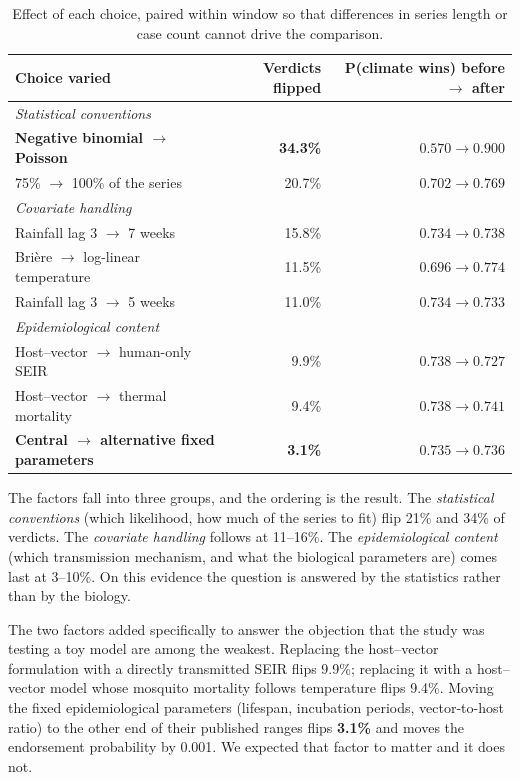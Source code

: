 \documentclass[11pt,a4paper]{article}
\begin{document}
\begin{table}[htbp]
\centering
\caption{Effect of each choice, paired within window so that differences in
series length or case count cannot drive the comparison.}
\begin{tabular}{lrr}
\toprule
Choice varied & Verdicts flipped & P(climate wins) before $\to$ after \\
\midrule
\multicolumn{3}{l}{\emph{Statistical conventions}} \\
\textbf{Negative binomial $\to$ Poisson} & \textbf{34.3\%} & $0.570 \to 0.900$ \\
75\% $\to$ 100\% of the series & 20.7\% & $0.702 \to 0.769$ \\
\midrule
\multicolumn{3}{l}{\emph{Covariate handling}} \\
Rainfall lag 3 $\to$ 7 weeks & 15.8\% & $0.734 \to 0.738$ \\
Brière $\to$ log-linear temperature & 11.5\% & $0.696 \to 0.774$ \\
Rainfall lag 3 $\to$ 5 weeks & 11.0\% & $0.734 \to 0.733$ \\
\midrule
\multicolumn{3}{l}{\emph{Epidemiological content}} \\
Host--vector $\to$ human-only SEIR & 9.9\% & $0.738 \to 0.727$ \\
Host--vector $\to$ thermal mortality & 9.4\% & $0.738 \to 0.741$ \\
\textbf{Central $\to$ alternative fixed parameters} & \textbf{3.1\%} & $0.735 \to 0.736$ \\
\bottomrule
\end{tabular}
\end{table}

The factors fall into three groups, and the ordering is the result. The
\emph{statistical conventions} (which likelihood, how much of the series to
fit) flip 21\% and 34\% of verdicts. The \emph{covariate handling} follows at
11--16\%. The \emph{epidemiological content} (which transmission mechanism, and
what the biological parameters are) comes last at 3--10\%. On this evidence the
question is answered by the statistics rather than by the biology.

The two factors added specifically to answer the objection that the study was
testing a toy model are among the weakest. Replacing the host--vector formulation
with a directly transmitted SEIR flips 9.9\%; replacing it with a host--vector
model whose mosquito mortality follows temperature flips 9.4\%. Moving the fixed
epidemiological parameters (lifespan, incubation periods, vector-to-host ratio) to the other end of their published ranges flips \textbf{3.1\%} and moves the
endorsement probability by 0.001. We expected that factor to matter and it does
not.
\end{document}
